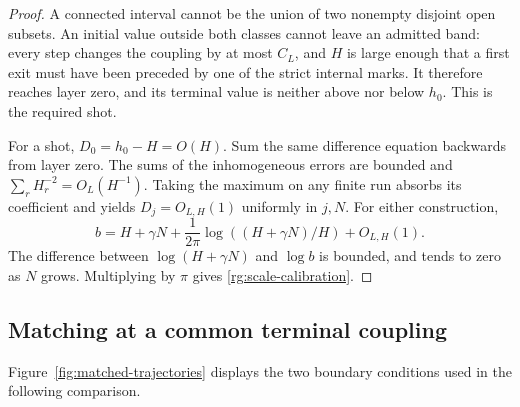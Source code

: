\begin{proof}
A connected interval cannot be the union of two nonempty
disjoint open subsets.  An initial value outside both
classes cannot leave an admitted band: every step changes
the coupling by at most $C_L$, and $H$ is large enough that
a first exit must have been preceded by one of the strict
internal marks.  It therefore reaches layer zero, and its
terminal value is neither above nor below $h_0$.  This is
the required shot.

For a shot, $D_0=h_0-H=O(H)$.  Sum the same difference equation
backwards from layer zero.  The sums of the inhomogeneous
errors are bounded and $\sum_rH_r^{-2}=O_L(H^{-1})$.
Taking the maximum on any finite run absorbs its coefficient
and yields $D_j=O_{L,H}(1)$ uniformly in $j,N$.  For either
construction,
\[
 b=H+\gamma N+\frac1{2\pi}\log((H+\gamma N)/H)
                                      +O_{L,H}(1).
\]
The difference between $\log(H+\gamma N)$ and $\log b$
is bounded, and tends to zero as $N$ grows.  Multiplying by
$\pi$ gives \eqref{rg:scale-calibration}.
\end{proof}

\subsection{Matching at a common terminal coupling}
\label{rg:terminal}

Figure~\ref{fig:matched-trajectories} displays the two boundary conditions
used in the following comparison.

\FloatBarrier

